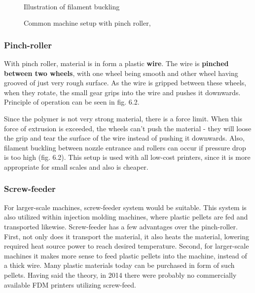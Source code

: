 \documentclass[a4paper, twoside, 11pt]{report}
\begin{document}
\begin{figure}[h]
\begin{minipage}[b]{0.45\textwidth}
  \end{minipage}
  \\[5pt]
  \begin{minipage}[t]{0.45\textwidth}
    \caption{Illustration of filament buckling \cite{FDMReview}}
  \end{minipage}
  \hfill
  \begin{minipage}[t]{0.45\textwidth}
    \caption{Common machine setup with pinch roller, \cite{MachineDesign}}
  \end{minipage}
\end{figure}

\subsubsection{Pinch-roller}
With pinch roller, material is in form a plastic \textbf{wire}. The wire is \textbf{pinched between two wheels}, with one wheel being smooth and other wheel having grooved of just very rough surface. As the wire is gripped between these wheels, when they rotate, the small gear grips into the wire and pushes it downwards. Principle of operation can be seen in fig. 6.2.

	Since the polymer is not very strong material, there is a force limit. When this force of extrusion is exceeded, the wheels can't push the material - they will loose the grip and tear the surface of the wire instead of pushing it downwards. Also, filament buckling between nozzle entrance and rollers can occur if pressure drop is too high (fig. 6.2).  This setup is used with all low-cost printers, since it is more appropriate for small scales and also is cheaper.
\subsubsection{Screw-feeder}
For larger-scale machines, screw-feeder system would be suitable. This system is also utilized within injection molding machines, where plastic pellets are fed and transported likewise. Screw-feeder has a few advantages over the pinch-roller. First, not only does it transport the material, it also heats the material, lowering required heat source power to reach desired temperature. Second, for larger-scale machines it makes more sense to feed plastic pellets into the machine, instead of a thick wire. Many plastic materials today can be purchased in form of such pellets. Having said the theory, in 2014 there were probably no commercially available FDM printers utilizing screw-feed. \cite[p. 193]{FDMReview}
\end{document}
